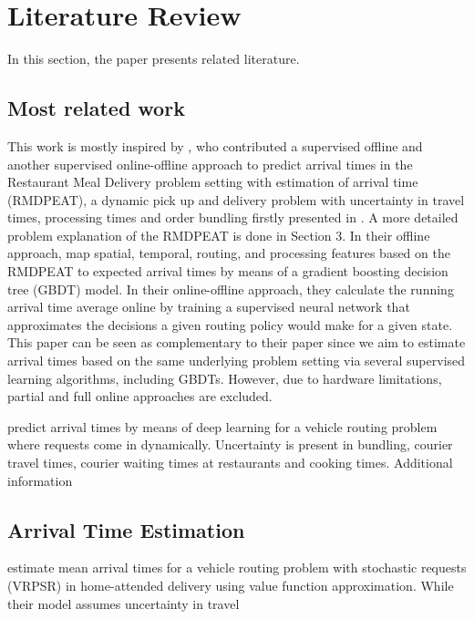 \chapter{Literature Review}

In this section, the paper presents related literature. 


\section{Most related work}

This work is mostly inspired by \cite{Hildebrandt2020_EAT}, who contributed a supervised offline and another supervised online-offline approach to predict arrival times in the Restaurant Meal Delivery problem setting with estimation of arrival time (RMDPEAT), a dynamic pick up and delivery problem with uncertainty in travel times, processing times and order bundling firstly  presented in \cite{UlmerRMDP}. A more detailed problem explanation of the RMDPEAT is done in Section 3. 
In their offline approach, \cite{Hildebrandt2020_EAT} map spatial, temporal, routing, and processing features based on the RMDPEAT to expected arrival times by means of a gradient boosting decision tree (GBDT) model. In their online-offline approach, they calculate the running arrival time average online by training a supervised neural network that approximates the decisions a given routing policy would make for a given state.
This paper can be seen as complementary to their paper since we aim to estimate arrival times based on the same underlying problem setting via several supervised learning algorithms, including GBDTs. However, due to hardware limitations, partial and full online approaches are excluded. 

\cite{Zhu2020_OFCTE_DL} predict arrival times by means of deep learning for a vehicle routing problem where requests come in dynamically. Uncertainty is present in bundling, courier travel times, courier waiting times at restaurants and cooking times. Additional information 

\section{Arrival Time Estimation}

\cite{UlmerBarrett2017_TWAP} estimate mean arrival times for a vehicle routing problem with stochastic requests (VRPSR) in home-attended delivery using value function approximation. While their model assumes uncertainty in travel 



